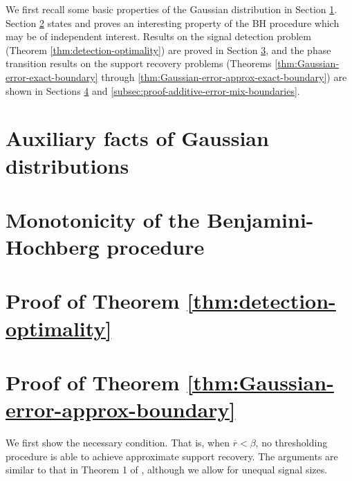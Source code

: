 
We first recall some basic properties of the Gaussian distribution in Section \ref{sec:Gaussian-distributions}.
Section \ref{suppsec:BH-monotonicity} states and proves an interesting property of the \ac{BH} procedure which may be of independent interest.
Results on the signal detection problem (Theorem \ref{thm:detection-optimality}) are proved in Section \ref{subsec:proof-additive-error-detection-boundaries}, and the phase transition results on the support recovery problems (Theorems \ref{thm:Gaussian-error-exact-boundary} through \ref{thm:Gaussian-error-approx-exact-boundary}) are shown in Sections \ref{subsec:proof-additive-error-approx-boundaries} and \ref{subsec:proof-additive-error-mix-boundaries}.


\section{Auxiliary facts of Gaussian distributions}
\label{sec:Gaussian-distributions}


\section{Monotonicity of the Benjamini-Hochberg procedure}
\label{suppsec:BH-monotonicity}


\section{Proof of Theorem \ref{thm:detection-optimality}}
\label{subsec:proof-additive-error-detection-boundaries}







\section{Proof of Theorem \ref{thm:Gaussian-error-approx-boundary}}
\label{subsec:proof-additive-error-approx-boundaries}

We first show the necessary condition. 
That is, when $\overline{r} < \beta$, no thresholding procedure is able to achieve approximate support recovery.
The arguments are similar to that in Theorem 1 of \cite{arias2017distribution}, although we allow for unequal signal sizes. 

